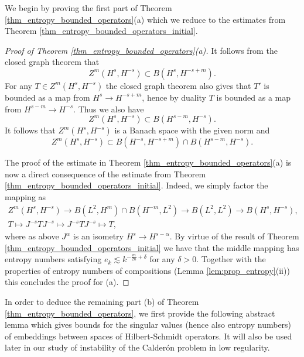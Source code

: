 \documentclass[12pt,twoside]{amsart}
\numberwithin{equation}{section}
\begin{document}
We begin by proving the first part of Theorem \ref{thm_entropy_bounded_operators}(a) which we reduce to the estimates from Theorem \ref{thm_entropy_bounded_operators_initial}.

\begin{proof}[Proof of Theorem \ref{thm_entropy_bounded_operators}(a)]
It follows from the closed graph theorem that 
\[
Z^m(H^s,H^{-s}) \subset B(H^s, H^{-s+m}).
\]
For any $T \in Z^m(H^s,H^{-s})$ the closed graph theorem also gives that $T'$ is bounded as a map from $H^s \to H^{-s+m}$, hence by duality $T$ is bounded as a map from $H^{s-m} \to H^{-s}$. Thus we also have 
\[
Z^m(H^s,H^{-s})\subset B(H^{s-m}, H^{-s}).
\]
It follows that $Z^m(H^s,H^{-s})$ is a Banach space with the given norm and
\[
Z^m(H^s,H^{-s}) \subset B(H^{-s}, H^{-s+m})\cap B(H^{s-m}, H^{-s}).
\]

The proof of the estimate in Theorem \ref{thm_entropy_bounded_operators}(a) is now a direct consequence of the estimate from Theorem \ref{thm_entropy_bounded_operators_initial}. Indeed, we simply factor the mapping as
\begin{gather*}
Z^m(H^s,H^{-s}) \rightarrow B(L^2,H^{m})\cap B(H^{-m},L^2)  \rightarrow B(L^2, L^2) \rightarrow B(H^s, H^{-s}), \\ 
T \mapsto J^{-s} T J^{-s} \mapsto J^{-s} T J^{-s} \mapsto T,
\end{gather*}
where as above $J^{\alpha}$ is an isometry $H^s \to H^{s-\alpha}$. By virtue of the result of Theorem \ref{thm_entropy_bounded_operators_initial} we have that the middle mapping has entropy numbers satisfying $e_k \lesssim k^{- \frac{m}{2n} + \delta}$ for any $\delta>0$. Together with the properties of entropy numbers of compositions (Lemma \ref{lem:prop_entropy}(ii)) this concludes the proof for (a).
\end{proof}



In order to deduce the remaining part (b) of Theorem \ref{thm_entropy_bounded_operators}, we first provide the following abstract lemma which gives bounds for the singular values (hence also entropy numbers) of embeddings between spaces of Hilbert-Schmidt operators. It will also be used later in our study of instability of the Calder\'on problem in low regularity.
\end{document}
